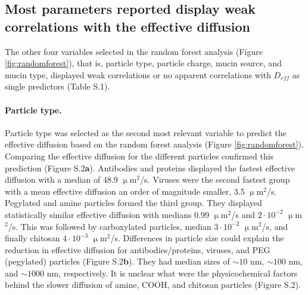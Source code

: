 \documentclass[aps,prl,preprint,superscriptaddress,showkeys,linenumbers]{revtex4-1}
\begin{document}
\subsection*{\textcolor{Antonio}{Most parameters reported display weak correlations with the effective diffusion}}
The other four variables selected in the random forest analysis (Figure \ref{fig:randomforest})\textcolor{Antonio}{, that is, particle type, particle charge, mucin source, and mucin type}, displayed weak correlations or no apparent correlations with $D_{eff}$ as single predictors (Table S.1).

\paragraph{Particle type.} Particle type was selected as the second most relevant variable to predict the effective diffusion based on the random forest analysis (Figure \ref{fig:randomforest}). Comparing the effective diffusion for the different particles confirmed this prediction (Figure S.2\textbf{a}).
Antibodies and proteins displayed the fastest effective diffusion with a median of 48.9 $\upmu$m$^2$/s. Viruses were the second fastest group with a mean effective diffusion an order of magnitude smaller, 3.5 $\upmu$m$^2$/s. Pegylated and amine particles formed the third group. They displayed statistically similar effective diffusion with medians 0.99 $\upmu$m$^2$/s and  $2 \cdot 10^{-2}$ $\upmu$m$^2$/s. This was followed by carboxylated particles, median $3 \cdot 10^{-2}$ $\upmu$m$^2$/s, and finally chitosan $4 \cdot 10^{-3}$ $\upmu$m$^2$/s. Differences in particle size could explain the reduction in effective diffusion for antibodies/proteins, viruses, and PEG (pegylated) particles (Figure S.2\textbf{b}). They had median sizes of $\sim 10$ nm,  $\sim 100$ nm, and $\sim 1000$ nm, respectively. It is unclear what were the physicochemical factors behind the slower diffusion of amine, COOH, and chitosan particles (Figure S.2).
\end{document}

